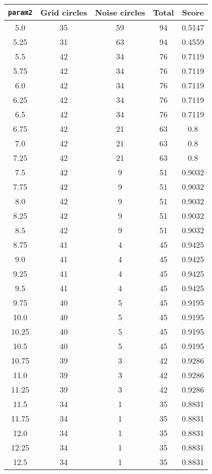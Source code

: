 \documentclass[letterpaper, 12pt]{article}
\begin{document}
\begin{longtable}{|c|c|c|c|c|}
\hline
\textbf{\texttt{param2}} & \textbf{Grid circles} & \textbf{Noise circles} & \textbf{Total} & \textbf{Score} \\
\hline
5.0 & 35 & 59 & 94 & 0.5147 \\
\hline
5.25 & 31 & 63 & 94 & 0.4559 \\
\hline
5.5 & 42 & 34 & 76 & 0.7119 \\
\hline
5.75 & 42 & 34 & 76 & 0.7119 \\
\hline
6.0 & 42 & 34 & 76 & 0.7119 \\
\hline
6.25 & 42 & 34 & 76 & 0.7119 \\
\hline
6.5 & 42 & 34 & 76 & 0.7119 \\
\hline
6.75 & 42 & 21 & 63 & 0.8 \\
\hline
7.0 & 42 & 21 & 63 & 0.8 \\
\hline
7.25 & 42 & 21 & 63 & 0.8 \\
\hline
7.5 & 42 & 9 & 51 & 0.9032 \\
\hline
7.75 & 42 & 9 & 51 & 0.9032 \\
\hline
8.0 & 42 & 9 & 51 & 0.9032 \\
\hline
8.25 & 42 & 9 & 51 & 0.9032 \\
\hline
8.5 & 42 & 9 & 51 & 0.9032 \\
\hline
8.75 & 41 & 4 & 45 & 0.9425 \\
\hline
9.0 & 41 & 4 & 45 & 0.9425 \\
\hline
9.25 & 41 & 4 & 45 & 0.9425 \\
\hline
9.5 & 41 & 4 & 45 & 0.9425 \\
\hline
9.75 & 40 & 5 & 45 & 0.9195 \\
\hline
10.0 & 40 & 5 & 45 & 0.9195 \\
\hline
10.25 & 40 & 5 & 45 & 0.9195 \\
\hline
10.5 & 40 & 5 & 45 & 0.9195 \\
\hline
10.75 & 39 & 3 & 42 & 0.9286 \\
\hline
11.0 & 39 & 3 & 42 & 0.9286 \\
\hline
11.25 & 39 & 3 & 42 & 0.9286 \\
\hline
11.5 & 34 & 1 & 35 & 0.8831 \\
\hline
11.75 & 34 & 1 & 35 & 0.8831 \\
\hline
12.0 & 34 & 1 & 35 & 0.8831 \\
\hline
12.25 & 34 & 1 & 35 & 0.8831 \\
\hline
12.5 & 34 & 1 & 35 & 0.8831 \\

\end{longtable}
\end{document}

